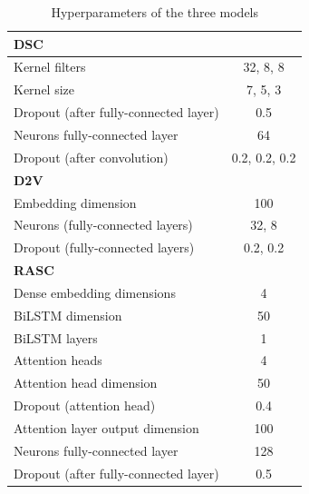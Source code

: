 \begin{table}[h!]
	\centering
	\begin{tabular}{| l | c |} 
		\hline
		\textbf{DSC}\\
		\hline
		Kernel filters & 32, 8, 8 \\
		Kernel size & 7, 5, 3 \\
		Dropout (after fully-connected layer) & 0.5\\
		Neurons fully-connected layer & 64 \\
		Dropout (after convolution) & 0.2, 0.2, 0.2\\
		\hline
		\textbf{D2V}\\
		\hline
		Embedding dimension & 100\\
		Neurons (fully-connected layers) & 32, 8\\
		Dropout (fully-connected layers) & 0.2, 0.2\\
		\hline
		\textbf{RASC} \\
		\hline
		Dense embedding dimensions & 4\\
		BiLSTM dimension & 50\\
		BiLSTM layers & 1\\
		Attention heads & 4\\
		Attention head dimension & 50\\
		Dropout (attention head) & 0.4 \\
		Attention layer output dimension & 100\\
		Neurons fully-connected layer & 128\\
		Dropout (after fully-connected layer) & 0.5\\
		\hline
	\end{tabular}
	\caption{Hyperparameters of the three models
	}
	\label{table:hyperparameters}
\end{table}
